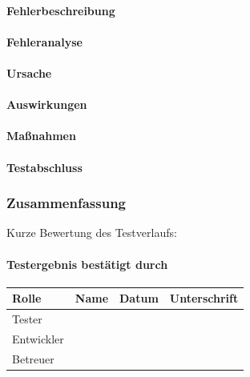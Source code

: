 \documentclass[
  a4paper,
  12pt,
  DIV=12,        %
  parskip=half,  %
  headings=small %
]{scrartcl}
\theoremstyle{definition}
\theoremstyle{definition}
\begin{document}
\paragraph{Fehlerbeschreibung}\label{fehlerbeschreibung}

\paragraph{Fehleranalyse}\label{fehleranalyse-1}

\paragraph{Ursache}\label{ursache}

\paragraph{Auswirkungen}\label{auswirkungen}

\paragraph{Maßnahmen}\label{mauxdfnahmen}

\paragraph{Testabschluss}\label{testabschluss-1}

\subsubsection{Zusammenfassung}\label{zusammenfassung-4}

Kurze Bewertung des Testverlaufs:

\paragraph{Testergebnis bestätigt
durch}\label{testergebnis-bestuxe4tigt-durch}

\begin{longtable}[]{@{}llll@{}}
\toprule\noalign{}
Rolle & Name & Datum & Unterschrift \\
\midrule\noalign{}
\endhead
\bottomrule\noalign{}
\endlastfoot
Tester & & & \\
Entwickler & & & \\
Betreuer & & & \\
\end{longtable}
\end{document}
